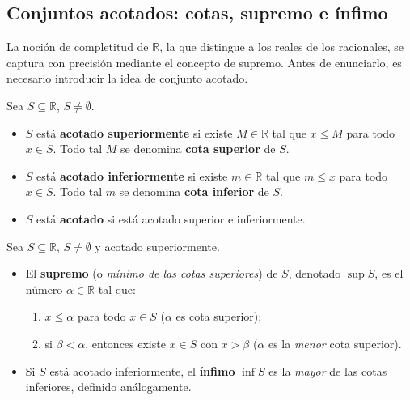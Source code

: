 \subsection{Conjuntos acotados: cotas, supremo e ínfimo}
\label{subsec:supremo}

La noción de completitud de $\mathbb{R}$, la que distingue a los reales de los
racionales, se captura con precisión mediante el concepto de supremo. Antes de
enunciarlo, es necesario introducir la idea de conjunto acotado.

\begin{definition}
\label{def:cotado}
Sea $S \subseteq \mathbb{R}$, $S \neq \emptyset$.
\begin{itemize}
   \item $S$ está \textbf{acotado superiormente} si existe $M \in \mathbb{R}$
         tal que $x \leq M$ para todo $x \in S$. Todo tal $M$ se denomina
         \textbf{cota superior} de $S$.
   \item $S$ está \textbf{acotado inferiormente} si existe $m \in \mathbb{R}$
         tal que $m \leq x$ para todo $x \in S$. Todo tal $m$ se denomina
         \textbf{cota inferior} de $S$.
   \item $S$ está \textbf{acotado} si está acotado superior e inferiormente.
\end{itemize}
\end{definition}

\begin{definition}\label{def:supremo}
Sea $S \subseteq \mathbb{R}$, $S \neq \emptyset$ y acotado superiormente.
\begin{itemize}
   \item El \textbf{supremo} (o \textit{mínimo de las cotas superiores}) de
         $S$, denotado $\sup S$, es el número $\alpha \in \mathbb{R}$ tal que:
         \begin{enumerate}
            \item $x \leq \alpha$ para todo $x \in S$ ($\alpha$ es cota
                  superior);
            \item si $\beta < \alpha$, entonces existe $x \in S$ con $x > \beta$
                  ($\alpha$ es la \emph{menor} cota superior).
         \end{enumerate}
   \item Si $S$ está acotado inferiormente, el \textbf{ínfimo} $\inf S$ es la
         \emph{mayor} de las cotas inferiores, definido análogamente.
\end{itemize}
\end{definition}

